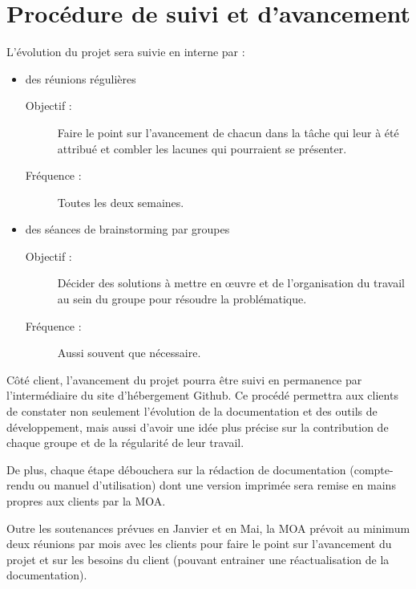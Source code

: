 \documentclass{../../res/univ-projet}
\begin{document}
\section{Procédure de suivi et d'avancement}
	L'évolution du projet sera suivie en interne par : 
	\begin{itemize}
		\item des réunions régulières 
		\begin{description}
			\item[Objectif :] Faire le point sur l'avancement de chacun dans la tâche qui leur à été attribué et combler les lacunes qui pourraient se présenter.
			\item[Fréquence :] Toutes les deux semaines.
		\end{description}
		\item des séances de brainstorming par groupes
		\begin{description}
			\item[Objectif :] Décider des solutions à mettre en œuvre et de l'organisation du travail au sein du groupe pour résoudre la problématique.
			\item[Fréquence :] Aussi souvent que nécessaire.
		\end{description}
	\end{itemize}

	Côté client, l'avancement du projet pourra être suivi en permanence par l'intermédiaire du site d'hébergement Github. Ce procédé permettra aux clients de constater non seulement l'évolution de la documentation et des outils de développement, mais aussi d'avoir une idée plus précise sur la contribution de chaque groupe et de la régularité de leur travail.

	De plus, chaque étape débouchera sur la rédaction de documentation (compte-rendu ou manuel d'utilisation) dont une version imprimée sera remise en mains propres aux clients par la MOA.

	Outre les soutenances prévues en Janvier et en Mai, la MOA prévoit au minimum deux réunions par mois avec les clients pour faire le point sur l'avancement du projet et sur les besoins du client (pouvant entrainer une réactualisation de la documentation).

\end{document}
